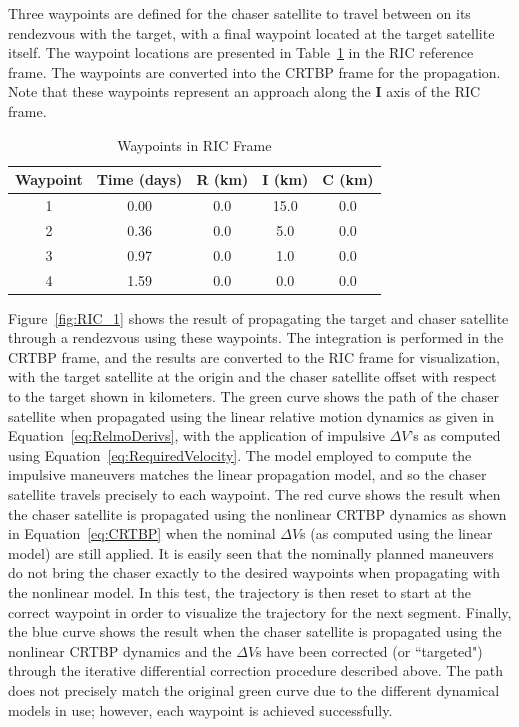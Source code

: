 \documentclass[letterpaper, preprint, paper,11pt]{AAS}	%
\begin{document}
Three waypoints are defined for the chaser satellite to travel between on its rendezvous with the target, with a final waypoint located at the target satellite itself.  The waypoint locations are presented in Table~\ref{tab:Waypoints_1} in the RIC reference frame.  The waypoints are converted into the CRTBP frame for the propagation.  Note that these waypoints represent an approach along the \(\mathbf{I}\) axis of the RIC frame. 

\begin{table}[htbp] 
	\fontsize{10}{10}\selectfont
	\caption{Waypoints in RIC Frame}
	\label{tab:Waypoints_1}
	\centering
	\begin{tabular}{ccccc}
		\hline
		Waypoint   & Time (days) & R (km) & I (km) & C (km) \\
		\hline
		1 & 0.00 & 0.0 & 15.0 & 0.0 \\
		2 & 0.36 & 0.0 & 5.0 & 0.0 \\
		3 & 0.97 & 0.0 & 1.0 & 0.0 \\
		4 & 1.59 & 0.0 & 0.0 & 0.0 \\
		\hline
	\end{tabular}
\end{table} 

Figure~\ref{fig:RIC_1} shows the result of propagating the target and chaser satellite through a rendezvous using these waypoints.  The integration is performed in the CRTBP frame, and the results are converted to the RIC frame for visualization, with the target satellite at the origin and the chaser satellite offset with respect to the target shown in kilometers.  The green curve shows the path of the chaser satellite when propagated using the linear relative motion dynamics as given in Equation~\eqref{eq:RelmoDerivs}, with the application of impulsive \(\Delta V\)'s as computed using Equation~\eqref{eq:RequiredVelocity}.  The model employed to compute the impulsive maneuvers matches the linear propagation model, and so the chaser satellite travels precisely to each waypoint.  The red curve shows the result when the chaser satellite is propagated using the nonlinear CRTBP dynamics as shown in Equation~\eqref{eq:CRTBP} when the nominal \(\Delta V\)s (as computed using the linear model) are still applied.  It is easily seen that the nominally planned maneuvers do not bring the chaser exactly to the desired waypoints when propagating with the nonlinear model. In this test, the trajectory is then reset to start at the correct waypoint in order to visualize the trajectory for the next segment. Finally, the blue curve shows the result when the chaser satellite is propagated using the nonlinear CRTBP dynamics and the \(\Delta V\)s have been corrected (or ``targeted") through the iterative differential correction procedure described above.  The path does not precisely match the original green curve due to the different dynamical models in use; however, each waypoint is achieved successfully.  %
\end{document}
